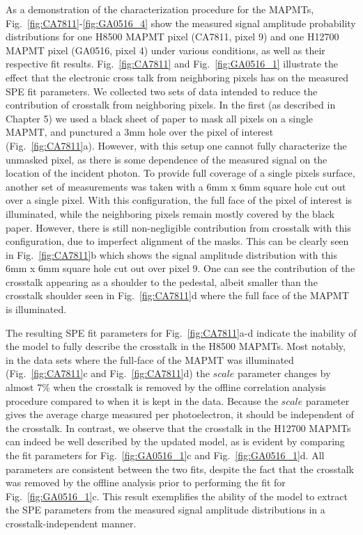 As a demonstration of the characterization procedure for the MAPMTs, Fig.~\ref{fig:CA7811}-\ref{fig:GA0516_4} show the measured signal amplitude probability distributions for one H8500 MAPMT pixel (CA7811, pixel 9) and one H12700 MAPMT pixel (GA0516, pixel 4) under various conditions, as well as their respective fit results. 
Fig.~\ref{fig:CA7811} and Fig.~\ref{fig:GA0516_1} illustrate the effect that the electronic cross talk from neighboring pixels has on the measured SPE fit parameters. 
We collected two sets of data intended to reduce the contribution of crosstalk from neighboring pixels. 
In the first (as described in Chapter 5) we used a black sheet of paper to mask all pixels on a single MAPMT, and punctured a 3mm hole over the pixel of interest (Fig.~\ref{fig:CA7811}a). 
However, with this setup one cannot fully characterize the unmasked pixel, as there is some dependence of the measured signal on the location of the incident photon. 
To provide full coverage of a single pixel\textquotesingle s surface, another set of measurements was taken with a 6mm x 6mm square hole cut out over a single pixel. 
With this configuration, the full face of the pixel of interest is illuminated, while the neighboring pixels remain mostly covered by the black paper. 
However, there is still non-negligible contribution from crosstalk with this configuration, due to imperfect alignment of the masks. 
This can be clearly seen in Fig.~\ref{fig:CA7811}b which shows the signal amplitude distribution with this 6mm x 6mm square hole cut out over pixel 9. 
One can see the contribution of the crosstalk appearing as a shoulder to the pedestal, albeit smaller than the crosstalk shoulder seen in Fig.~\ref{fig:CA7811}d where the full face of the MAPMT is illuminated. 

The resulting SPE fit parameters for Fig.~\ref{fig:CA7811}a-d indicate the inability of the model to fully describe the crosstalk in the H8500 MAPMTs. 
Most notably, in the data sets where the full-face of the MAPMT was illuminated (Fig.~\ref{fig:CA7811}c and Fig.~\ref{fig:CA7811}d) the $scale$ parameter changes by almost $7\%$ when the crosstalk is removed by the offline correlation analysis procedure compared to when it is kept in the data. 
Because the $scale$ parameter gives the average charge measured per photoelectron, it should be independent of the crosstalk. 
In contrast, we observe that the crosstalk in the H12700 MAPMTs can indeed be well described by the updated model, as is evident by comparing the fit parameters for Fig.~\ref{fig:GA0516_1}c and Fig.~\ref{fig:GA0516_1}d. 
All parameters are consistent between the two fits, despite the fact that the crosstalk was removed by the offline analysis prior to performing the fit for Fig.~\ref{fig:GA0516_1}c. 
This result exemplifies the ability of the model to extract the SPE parameters from the measured signal amplitude distributions in a crosstalk-independent manner. 


